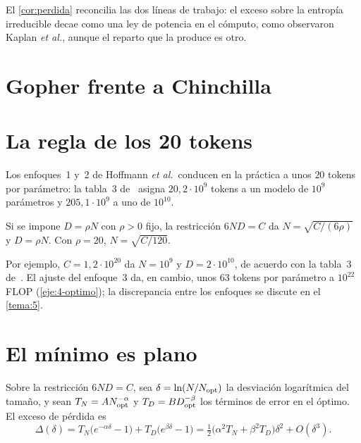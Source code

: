 El \cref{cor:perdida} reconcilia las dos líneas de trabajo: el exceso sobre la entropía irreducible decae como una ley de potencia en el cómputo, como observaron Kaplan \emph{et al.}, aunque el reparto que la produce es otro.

\section{Gopher frente a Chinchilla}

\addtocounter{definicion}{1}%

\section{La regla de los 20 tokens}

Los enfoques~1 y~2 de Hoffmann \emph{et al.}\ conducen en la práctica a unos $20$ tokens por parámetro: la tabla~3 de~\cite{hoffmann} asigna $20{,}2\cdot 10^{9}$ tokens a un modelo de $10^{9}$ parámetros y $205{,}1\cdot 10^{9}$ a uno de $10^{10}$.

\begin{proposicion}\label{prop:regla20}
Si se impone $D=\rho N$ con $\rho>0$ fijo, la restricción $6ND=C$ da $N=\sqrt{C/(6\rho)}$ y $D=\rho N$. Con $\rho=20$, $N=\sqrt{C/120}$.
\end{proposicion}

Por ejemplo, $C=1{,}2\cdot 10^{20}$ da $N=10^{9}$ y $D=2\cdot 10^{10}$, de acuerdo con la tabla~3 de~\cite{hoffmann}. El ajuste del enfoque~3 da, en cambio, unos $63$ tokens por parámetro a $10^{22}$ FLOP (\cref{eje:4-optimo}); la discrepancia entre los enfoques se discute en el \cref{tema:5}.

\section{El mínimo es plano}

\begin{proposicion}\label{prop:plano}
Sobre la restricción $6ND=C$, sea $\delta=\ln(N/N_{\mathrm{opt}})$ la desviación logarítmica del tamaño, y sean $T_N=AN_{\mathrm{opt}}^{-\alpha}$ y $T_D=BD_{\mathrm{opt}}^{-\beta}$ los términos de error en el óptimo. El exceso de pérdida es
\[
\Delta(\delta)=T_N\bigl(e^{-\alpha\delta}-1\bigr)+T_D\bigl(e^{\beta\delta}-1\bigr)=\tfrac12\bigl(\alpha^{2}T_N+\beta^{2}T_D\bigr)\delta^{2}+O(\delta^{3}).
\]
\end{proposicion}

\addtocounter{definicion}{1}%

